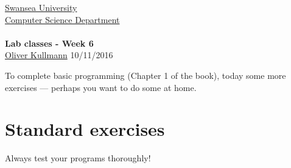 \documentclass[11pt]{article}
\newcommand{\Java}{\lstset{language=Java,keywordstyle=\bfseries,breaklines,breakindent=30pt}}
\begin{document}
\begin{center}
  \href{http://www.swan.ac.uk/}{Swansea University}\\
  \href{http://www.swan.ac.uk/compsci/}{Computer Science Department}\\[1ex]
  \href{\chp}{\module}\\[1ex]
  \textbf{Lab classes - Week 6}\\
  \href{http://cs.swan.ac.uk/~csoliver}{Oliver Kullmann} 10/11/2016
\end{center}


To complete basic programming (Chapter 1 of the book), today some more exercises --- perhaps you want to do some at home.


\section{Standard exercises}
\label{sec:stdex}

\Java

Always test your programs thoroughly!
\end{document}

